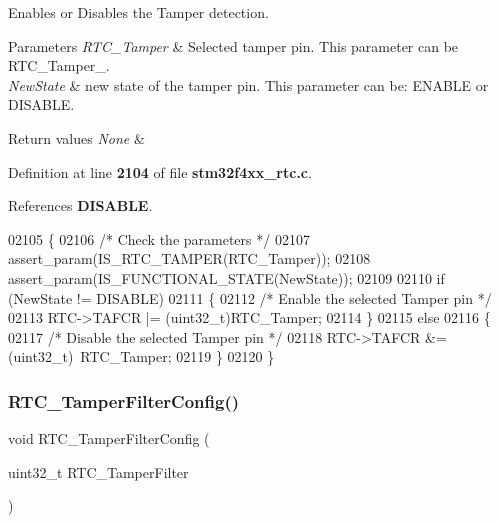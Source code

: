 Enables or Disables the Tamper detection. 


\begin{DoxyParams}{Parameters}
{\em R\+T\+C\+\_\+\+Tamper} & Selected tamper pin. This parameter can be R\+T\+C\+\_\+\+Tamper\+\_. \\
\hline
{\em New\+State} & new state of the tamper pin. This parameter can be\+: E\+N\+A\+B\+LE or D\+I\+S\+A\+B\+LE. \\
\hline
\end{DoxyParams}

\begin{DoxyRetVals}{Return values}
{\em None} & \\
\hline
\end{DoxyRetVals}


Definition at line \textbf{ 2104} of file \textbf{ stm32f4xx\+\_\+rtc.\+c}.



References \textbf{ D\+I\+S\+A\+B\+LE}.


\begin{DoxyCode}
02105 \{
02106   \textcolor{comment}{/* Check the parameters */}
02107   assert_param(IS_RTC_TAMPER(RTC\_Tamper));  
02108   assert_param(IS_FUNCTIONAL_STATE(NewState));
02109   
02110   \textcolor{keywordflow}{if} (NewState != DISABLE)
02111   \{
02112     \textcolor{comment}{/* Enable the selected Tamper pin */}
02113     RTC->TAFCR |= (uint32\_t)RTC\_Tamper;
02114   \}
02115   \textcolor{keywordflow}{else}
02116   \{
02117     \textcolor{comment}{/* Disable the selected Tamper pin */}
02118     RTC->TAFCR &= (uint32\_t)~RTC\_Tamper;    
02119   \}  
02120 \}
\end{DoxyCode}
\mbox{\label{group__RTC__Group9_ga1e87b9ae757ad12d7585e4fbcbf2c4b8}} 
\subsubsection{R\+T\+C\+\_\+\+Tamper\+Filter\+Config()}
{\footnotesize\ttfamily void R\+T\+C\+\_\+\+Tamper\+Filter\+Config (\begin{DoxyParamCaption}\item[{uint32\+\_\+t}]{R\+T\+C\+\_\+\+Tamper\+Filter }\end{DoxyParamCaption})}




